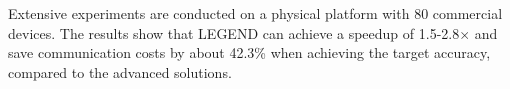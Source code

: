 Extensive experiments are conducted on a physical platform with 80 commercial devices. The results show that LEGEND can achieve a speedup of 1.5-2.8$\times$ and save communication costs by about 42.3\% when achieving the target accuracy, compared to the advanced solutions.
